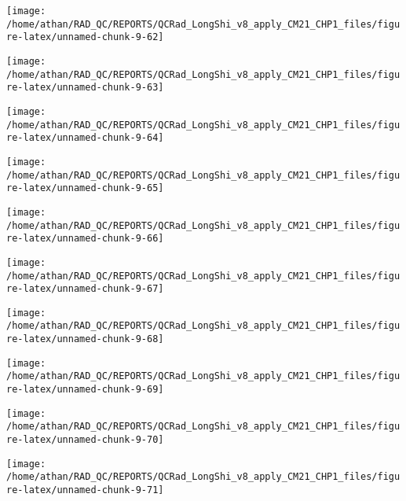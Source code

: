 \documentclass[
  10pt,
  a4paper,oneside]{article}
\begin{document}
\begin{center}\texttt{[image: /home/athan/RAD\_QC/REPORTS/QCRad\_LongShi\_v8\_apply\_CM21\_CHP1\_files/figure-latex/unnamed-chunk-9-62]} \end{center}

\begin{center}\texttt{[image: /home/athan/RAD\_QC/REPORTS/QCRad\_LongShi\_v8\_apply\_CM21\_CHP1\_files/figure-latex/unnamed-chunk-9-63]} \end{center}

\begin{center}\texttt{[image: /home/athan/RAD\_QC/REPORTS/QCRad\_LongShi\_v8\_apply\_CM21\_CHP1\_files/figure-latex/unnamed-chunk-9-64]} \end{center}

\begin{center}\texttt{[image: /home/athan/RAD\_QC/REPORTS/QCRad\_LongShi\_v8\_apply\_CM21\_CHP1\_files/figure-latex/unnamed-chunk-9-65]} \end{center}

\begin{center}\texttt{[image: /home/athan/RAD\_QC/REPORTS/QCRad\_LongShi\_v8\_apply\_CM21\_CHP1\_files/figure-latex/unnamed-chunk-9-66]} \end{center}

\begin{center}\texttt{[image: /home/athan/RAD\_QC/REPORTS/QCRad\_LongShi\_v8\_apply\_CM21\_CHP1\_files/figure-latex/unnamed-chunk-9-67]} \end{center}

\begin{center}\texttt{[image: /home/athan/RAD\_QC/REPORTS/QCRad\_LongShi\_v8\_apply\_CM21\_CHP1\_files/figure-latex/unnamed-chunk-9-68]} \end{center}

\begin{center}\texttt{[image: /home/athan/RAD\_QC/REPORTS/QCRad\_LongShi\_v8\_apply\_CM21\_CHP1\_files/figure-latex/unnamed-chunk-9-69]} \end{center}

\begin{center}\texttt{[image: /home/athan/RAD\_QC/REPORTS/QCRad\_LongShi\_v8\_apply\_CM21\_CHP1\_files/figure-latex/unnamed-chunk-9-70]} \end{center}

\begin{center}\texttt{[image: /home/athan/RAD\_QC/REPORTS/QCRad\_LongShi\_v8\_apply\_CM21\_CHP1\_files/figure-latex/unnamed-chunk-9-71]} \end{center}
\end{document}
